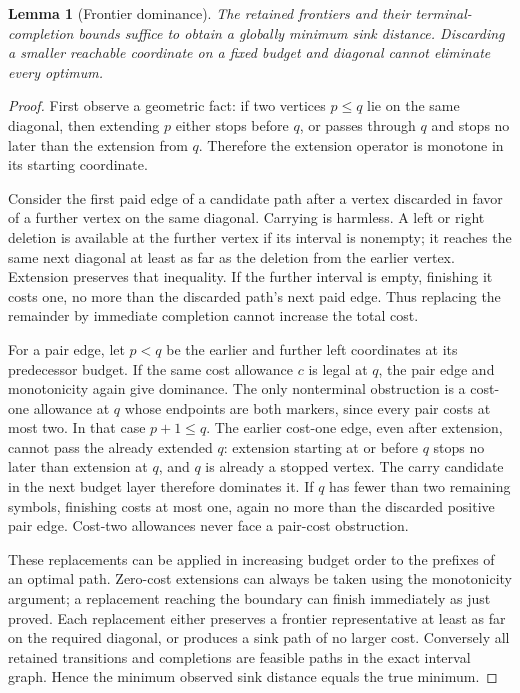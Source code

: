 \documentclass[sigconf,screen]{acmart}
\newtheorem{lemma}[theorem]{Lemma}
\theoremstyle{definition}
\begin{document}
\begin{lemma}[Frontier dominance]\label{lem:dominance}
The retained frontiers and their terminal-completion bounds suffice to obtain a globally minimum sink distance. Discarding a smaller reachable coordinate on a fixed budget and diagonal cannot eliminate every optimum.
\end{lemma}
\begin{proof}
First observe a geometric fact: if two vertices $p\le q$ lie on the same diagonal, then extending $p$ either stops before $q$, or passes through $q$ and stops no later than the extension from $q$. Therefore the extension operator is monotone in its starting coordinate.

Consider the first paid edge of a candidate path after a vertex discarded in favor of a further vertex on the same diagonal. Carrying is harmless. A left or right deletion is available at the further vertex if its interval is nonempty; it reaches the same next diagonal at least as far as the deletion from the earlier vertex. Extension preserves that inequality. If the further interval is empty, finishing it costs one, no more than the discarded path's next paid edge. Thus replacing the remainder by immediate completion cannot increase the total cost.

For a pair edge, let $p<q$ be the earlier and further left coordinates at its predecessor budget. If the same cost allowance $c$ is legal at $q$, the pair edge and monotonicity again give dominance. The only nonterminal obstruction is a cost-one allowance at $q$ whose endpoints are both markers, since every pair costs at most two. In that case $p+1\le q$. The earlier cost-one edge, even after extension, cannot pass the already extended $q$: extension starting at or before $q$ stops no later than extension at $q$, and $q$ is already a stopped vertex. The carry candidate in the next budget layer therefore dominates it. If $q$ has fewer than two remaining symbols, finishing costs at most one, again no more than the discarded positive pair edge. Cost-two allowances never face a pair-cost obstruction.

These replacements can be applied in increasing budget order to the prefixes of an optimal path. Zero-cost extensions can always be taken using the monotonicity argument; a replacement reaching the boundary can finish immediately as just proved. Each replacement either preserves a frontier representative at least as far on the required diagonal, or produces a sink path of no larger cost. Conversely all retained transitions and completions are feasible paths in the exact interval graph. Hence the minimum observed sink distance equals the true minimum.
\end{proof}
\end{document}
